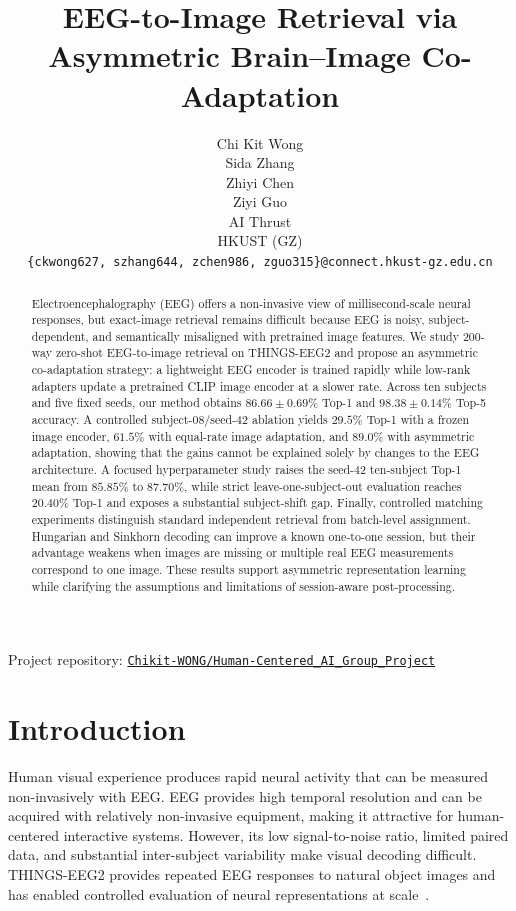 \documentclass{article}
\title{EEG-to-Image Retrieval via Asymmetric Brain--Image Co-Adaptation}
\author{
Chi Kit Wong \\
Sida Zhang \\
Zhiyi Chen \\
Ziyi Guo \\
AI Thrust\\
HKUST (GZ)\\
\texttt{\{ckwong627, szhang644, zchen986, zguo315\}@connect.hkust-gz.edu.cn}
}
\begin{document}
\maketitle

\begin{center}
\small Project repository: \href{https://github.com/Chikit-WONG/Human-Centered_AI_Group_Project}{\texttt{Chikit-WONG/Human-Centered\_AI\_Group\_Project}}
\end{center}

\begin{abstract}
Electroencephalography (EEG) offers a non-invasive view of millisecond-scale neural responses, but exact-image retrieval remains difficult because EEG is noisy, subject-dependent, and semantically misaligned with pretrained image features. We study 200-way zero-shot EEG-to-image retrieval on THINGS-EEG2 and propose an asymmetric co-adaptation strategy: a lightweight EEG encoder is trained rapidly while low-rank adapters update a pretrained CLIP image encoder at a slower rate. Across ten subjects and five fixed seeds, our method obtains $86.66\pm0.69\%$ Top-1 and $98.38\pm0.14\%$ Top-5 accuracy. A controlled subject-08/seed-42 ablation yields $29.5\%$ Top-1 with a frozen image encoder, $61.5\%$ with equal-rate image adaptation, and $89.0\%$ with asymmetric adaptation, showing that the gains cannot be explained solely by changes to the EEG architecture. A focused hyperparameter study raises the seed-42 ten-subject Top-1 mean from $85.85\%$ to $87.70\%$, while strict leave-one-subject-out evaluation reaches $20.40\%$ Top-1 and exposes a substantial subject-shift gap. Finally, controlled matching experiments distinguish standard independent retrieval from batch-level assignment. Hungarian and Sinkhorn decoding can improve a known one-to-one session, but their advantage weakens when images are missing or multiple real EEG measurements correspond to one image. These results support asymmetric representation learning while clarifying the assumptions and limitations of session-aware post-processing.
\end{abstract}

\section{Introduction}
\label{sec:introduction}

Human visual experience produces rapid neural activity that can be measured non-invasively with EEG. EEG provides high temporal resolution and can be acquired with relatively non-invasive equipment, making it attractive for human-centered interactive systems. However, its low signal-to-noise ratio, limited paired data, and substantial inter-subject variability make visual decoding difficult. THINGS-EEG2 provides repeated EEG responses to natural object images and has enabled controlled evaluation of neural representations at scale~\citep{gifford2022things}.
\end{document}

